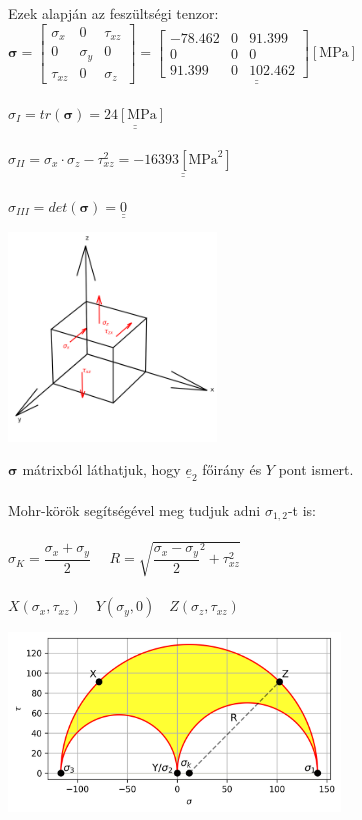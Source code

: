 \documentclass[10pt, a4paper]{article}
\newcommand{\ot}{\begin{trivlist}\item[\hskip \labelsep {\bfseries 
			{5. Feladat:}}]\end{trivlist}}
\newcommand{\mpa}{\mathrm{\left[MPa\right]}}
\begin{document}
	Ezek alapján az feszültségi tenzor: $\boldsymbol{\sigma} = 
	\begin{bmatrix}
		\sigma_x & 0 & \tau_{xz}\\
		0 & \sigma_y & 0\\
		\tau_{xz} & 0 & \sigma_z
	\end{bmatrix} = 
	\underline{\underline{\begin{bmatrix}
		-78.462 & 0 & 91.399\\
		0 & 0 & 0\\
		91.399 & 0 & 102.462
	\end{bmatrix} \mpa}}$\\\\
	$\sigma_I = tr(\boldsymbol{\sigma}) = \underline{\underline{24 \mpa}}$\\\\
	$\sigma_{II} = \sigma_x \cdot \sigma_z - \tau^2_{xz} = \underline{\underline{-16393 \left[\text{MPa}^2\right]}}$\\\\
	$\sigma_{III} = det(\boldsymbol{\sigma}) = \underline{\underline{0}}$
	\begin{center}
		\includegraphics[width=157pt]{ kocka.png }
	\end{center}
	\ot
	$\boldsymbol{\sigma}$ mátrixból láthatjuk, hogy $\underline{e}_2$ főirány és $Y$ pont ismert.\\\\
	Mohr-körök segítségével meg tudjuk adni $\sigma_{1,2}$-t is:\\\\
	$\sigma_K = \dfrac{\sigma_x + \sigma_y}{2} \quad$
	$R = \sqrt{\dfrac{\sigma_x - \sigma_y}{2}^2 + \tau^2_{xz}}$\\\\
	$X(\sigma_x,\tau_{xz}) \quad Y(\sigma_y, 0) \quad Z(\sigma_z, \tau_{xz})$\\
	\begin{center}
		\includegraphics[width=250pt]{ Mohr.png }
	\end{center}
\end{document}
